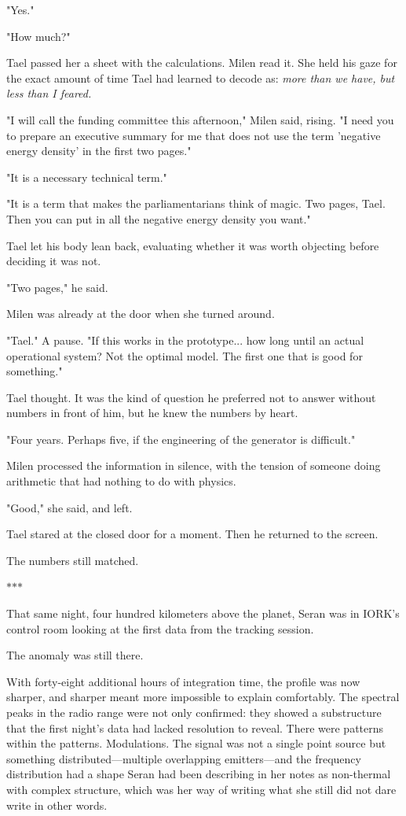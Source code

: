\documentclass[11pt,a5paper,twoside]{book}
\begin{document}
"Yes."

"How much?"

Tael passed her a sheet with the calculations. Milen read it. She held his gaze for the exact amount of time Tael had learned to decode as: \textit{more than we have, but less than I feared.}

"I will call the funding committee this afternoon," Milen said, rising. "I need you to prepare an executive summary for me that does not use the term 'negative energy density' in the first two pages."

"It is a necessary technical term."

"It is a term that makes the parliamentarians think of magic. Two pages, Tael. Then you can put in all the negative energy density you want."

Tael let his body lean back, evaluating whether it was worth objecting before deciding it was not.

"Two pages," he said.

Milen was already at the door when she turned around.

"Tael." A pause. "If this works in the prototype... how long until an actual operational system? Not the optimal model. The first one that is good for something."

Tael thought. It was the kind of question he preferred not to answer without numbers in front of him, but he knew the numbers by heart.

"Four years. Perhaps five, if the engineering of the generator is difficult."

Milen processed the information in silence, with the tension of someone doing arithmetic that had nothing to do with physics.

"Good," she said, and left.

Tael stared at the closed door for a moment. Then he returned to the screen.

The numbers still matched.

\vspace{1.5em}
\begin{center}$\ast$\quad$\ast$\quad$\ast$\end{center}
\vspace{1.5em}

That same night, four hundred kilometers above the planet, Seran was in IORK’s control room looking at the first data from the tracking session.

The anomaly was still there.

With forty-eight additional hours of integration time, the profile was now sharper, and sharper meant more impossible to explain comfortably. The spectral peaks in the radio range were not only confirmed: they showed a substructure that the first night's data had lacked resolution to reveal. There were patterns within the patterns. Modulations. The signal was not a single point source but something distributed—multiple overlapping emitters—and the frequency distribution had a shape Seran had been describing in her notes as non-thermal with complex structure, which was her way of writing what she still did not dare write in other words.
\end{document}
